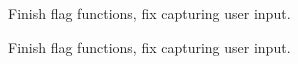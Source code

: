 
\begin{DoxyRefList}
\item[\label{todo__todo000001}%
\hypertarget{todo__todo000001}{}%
File \hyperlink{gl_8c}{gl.c} ]Finish flag functions, fix capturing user input.  
\item[\label{todo__todo000002}%
\hypertarget{todo__todo000002}{}%
File \hyperlink{life_8c}{life.c} ]Finish flag functions, fix capturing user input. 
\end{DoxyRefList}